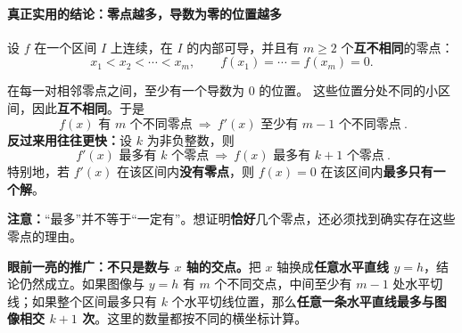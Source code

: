 \begin{statementbox}
\paragraph{真正实用的结论：零点越多，导数为零的位置越多}
设 $f$ 在一个区间 $I$ 上连续，在 $I$ 的内部可导，并且有 $m\ge2$ 个\textbf{互不相同}的零点：
\[
x_1<x_2<\cdots<x_m,\qquad f(x_1)=\cdots=f(x_m)=0.
\]
\begin{center}\end{center}
在每一对相邻零点之间，至少有一个导数为 $0$ 的位置。
这些位置分处不同的小区间，因此\textbf{互不相同}。于是
\[
\boxed{\ f(x)\text{ 有 }m\text{ 个不同零点}\ \Longrightarrow\ f'(x)\text{ 至少有 }m-1\text{ 个不同零点}\ }.
\]
\textbf{反过来用往往更快：}设 $k$ 为非负整数，则
\[
\boxed{\ f'(x)\text{ 最多有 }k\text{ 个零点}\ \Longrightarrow\ f(x)\text{ 最多有 }k+1\text{ 个零点}\ }.
\]
特别地，若 $f'(x)$ 在该区间内\textbf{没有零点}，则 $f(x)=0$ 在该区间内\textbf{最多只有一个解}。

\textbf{注意：}“最多”并不等于“一定有”。想证明\textbf{恰好}几个零点，还必须找到确实存在这些零点的理由。

\textbf{眼前一亮的推广：不只是数与 $x$ 轴的交点。}把 $x$ 轴换成\textbf{任意水平直线 $y=h$}，结论仍然成立。如果图像与 $y=h$ 有 $m$ 个不同交点，中间至少有 $m-1$ 处水平切线；如果整个区间最多只有 $k$ 个水平切线位置，那么\textbf{任意一条水平直线最多与图像相交 $k+1$ 次}。这里的数量都按不同的横坐标计算。

\end{statementbox}
